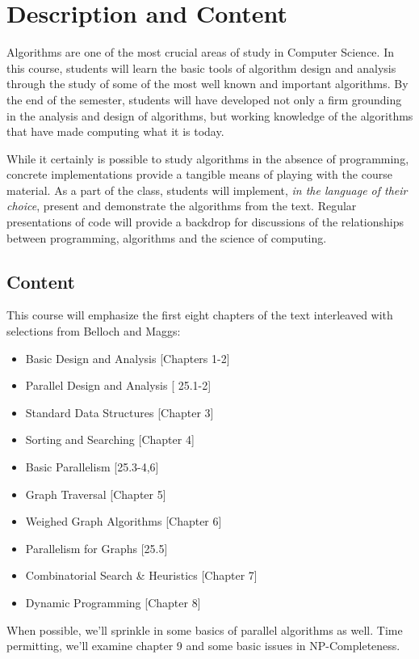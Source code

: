 \documentclass[10pt]{article}
\begin{document}
\section{Description and Content}

Algorithms are one of the most crucial areas of study in Computer Science.  In this course, students will learn the basic tools of algorithm design and analysis through the study of some of the most well known and important algorithms.  By the end of the semester, students will have developed not only a firm grounding in the analysis and design of algorithms, but working knowledge of the algorithms that have made computing what it is today.

While it certainly is possible to study algorithms in the absence of programming, concrete implementations provide a tangible means of playing with the course material.  As a part of the class, students will implement, \textit{in the language of their choice}, present and demonstrate the algorithms from the text. Regular presentations of code will provide a backdrop for discussions of the relationships between programming, algorithms and the science of computing. 

\subsection{Content}

This course will emphasize the first eight chapters of the text interleaved with selections from Belloch and Maggs:
\begin{itemize}
\item Basic Design and Analysis [Chapters 1-2]
\item Parallel Design and Analysis [ 25.1-2]
\item Standard Data Structures [Chapter 3]
\item Sorting and Searching [Chapter 4]
\item Basic Parallelism [25.3-4,6]
\item Graph Traversal [Chapter 5]
\item Weighed Graph Algorithms [Chapter 6]
\item Parallelism for Graphs [25.5]
\item Combinatorial Search \& Heuristics [Chapter 7]
\item Dynamic Programming [Chapter 8]
\end{itemize}
When possible, we'll sprinkle in some basics of parallel algorithms as well. Time permitting, we'll examine chapter 9 and some basic issues in NP-Completeness. 
\end{document}
